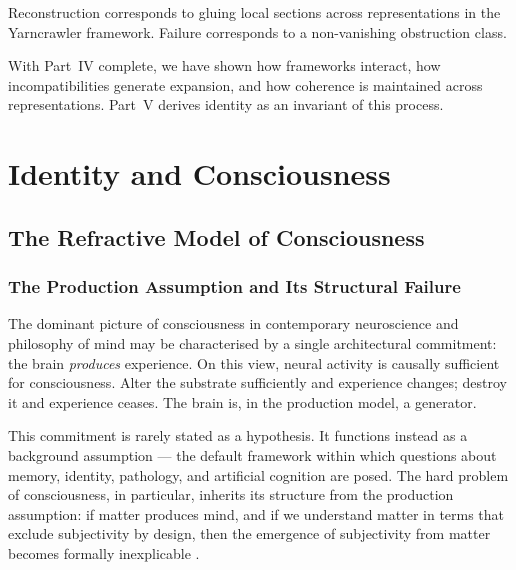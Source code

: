 \documentclass[11pt,openany]{book}
\begin{document}
\begin{proposition}
\label{prop:gluing}
Reconstruction corresponds to gluing local sections across
representations in the Yarncrawler framework. Failure
corresponds to a non-vanishing obstruction class.
\end{proposition}

With Part~IV complete, we have shown how frameworks
interact, how incompatibilities generate expansion, and how
coherence is maintained across representations. Part~V
derives identity as an invariant of this process.


\part{Identity and Consciousness}


\chapter{The Refractive Model of Consciousness}
\label{ch:refractive-consciousness}

\section{The Production Assumption and Its Structural Failure}
\label{sec:production-assumption}

The dominant picture of consciousness in contemporary
neuroscience and philosophy of mind may be characterised by
a single architectural commitment: the brain \emph{produces}
experience.  On this view, neural activity is causally
sufficient for consciousness.  Alter the substrate
sufficiently and experience changes; destroy it and
experience ceases.  The brain is, in the production model,
a generator.

This commitment is rarely stated as a hypothesis.  It
functions instead as a background assumption --- the default
framework within which questions about memory, identity,
pathology, and artificial cognition are posed.  The hard
problem of consciousness, in particular, inherits its
structure from the production assumption: if matter produces
mind, and if we understand matter in terms that exclude
subjectivity by design, then the emergence of subjectivity
from matter becomes formally inexplicable
\citep{chalmers1996conscious}.
\end{document}
